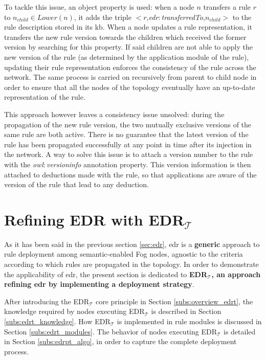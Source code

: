 \documentclass{iosart2c}
\newcommand{\edrt}{EDR$_{\mathcal{T}}$\xspace}
\newcommand{\namespace}[1]{\textit{#1$:$}}
\newcommand{\concept}[2]{\namespace{#1}\-\textit{#2}}
\newcommand{\triplet}[3]{$<$#1,\textit{#2},#3$>$}
\begin{document}
To tackle this issue, an object property is used: when a node $n$ transfers a rule $r$ to $n_{child}\in Lower(n)$, it adds the triple \triplet{$r$}{\concept{edr}{transferred\-To}}{$n_{child}$} to the rule description stored in its \gls{kb}.
When a node updates a rule representation, it transfers the new rule version towards the children which received the former version by searching for this property.
If said children are not able to apply the new version of the rule (as determined by the application module of the rule), updating their rule representation enforces the consistency of the rule across the network. 
The same process is carried on recursively from parent to child node in order to ensure that all the nodes of the topology eventually have an up-to-date representation of the rule.

This approach however leaves a consistency issue unsolved: during the propagation of the new rule version, the two mutually exclusive versions of the same rule are both active. 
There is no guarantee that the latest version of the rule has been propagated successfully at any point in time after its injection in the network.
A way to solve this issue is to attach a version number to the rule with the \concept{owl}{version\-info} annotation property.
This version information is then attached to deductions made with the rule, so that applications are aware of the version of the rule that lead to any deduction.

\section{Refining EDR with \edrt}
\label{sec:edrpt}

As it has been said in the previous section \textsection \ref{sec:edr}, \gls{edr} is a \textbf{generic} approach to rule deployment among semantic-enabled Fog nodes, agnostic to the criteria according to which rules are propagated in the topology.
In order to demonstrate the applicability of \gls{edr}, the present section is dedicated to \textbf{\edrt, an approach refining \gls{edr} by implementing a deployment strategy}.

After introducing the \edrt core principle in Section \textsection \ref{subs:overview_edrt}, the knowledge required by nodes executing \edrt is described in Section \textsection \ref{subs:edrt_knowledge}.
How \edrt is implemented in rule modules is discussed in Section \textsection \ref{subs:edrt_modules}.
The behavior of nodes executing \edrt is detailed in Section \textsection \ref{subs:edrpt_algo}, in order to capture the complete deployment process.
\end{document}
